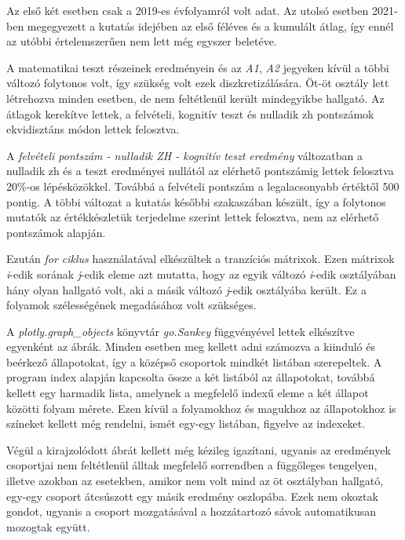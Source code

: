 \documentclass[12pt]{article}
\begin{document}
Az első két esetben csak a 2019-es évfolyamról volt adat. Az utolsó esetben 2021-ben megegyezett a kutatás idejében az első féléves és a kumulált átlag, így ennél az utóbbi értelemszerűen nem lett még egyszer beletéve.

A matematikai teszt részeinek eredményein és az \textit{A1}, \textit{A2} jegyeken kívül a többi változó folytonos volt, így szükség volt ezek diszkretizálására. Öt-öt osztály lett létrehozva minden esetben, de nem feltétlenül került mindegyikbe hallgató. Az átlagok kerekítve lettek, a felvételi, kognitív teszt és nulladik zh pontszámok ekvidisztáns módon lettek felosztva.

A \textit{felvételi pontszám - nulladik ZH - kognitív teszt eredmény} változatban a nulladik zh és a teszt eredményei nullától az elérhető pontszámig lettek felosztva 20\%-os lépésközökkel. Továbbá a felvételi pontszám a legalacsonyabb értéktől 500 pontig. A többi változat a kutatás későbbi szakaszában készült, így a folytonos mutatók az értékkészletük terjedelme szerint lettek felosztva, nem az elérhető pontszámok alapján.

Ezután \textit{for ciklus} használatával elkészültek a tranzíciós mátrixok. Ezen mátrixok \textit{i}-edik sorának \textit{j}-edik eleme azt mutatta, hogy az egyik változó \textit{i}-edik osztályában hány olyan hallgató volt, aki a másik változó \textit{j}-edik osztályába került. Ez a folyamok szélességének megadásához volt szükséges.

A \textit{plotly.graph\_objects} könyvtár \textit{go.Sankey} függvényével lettek elkészítve egyenként az ábrák. Minden esetben meg kellett adni számozva a kiinduló és beérkező állapotokat, így a középső csoportok mindkét listában szerepeltek. A program index alapján kapcsolta össze a két listából az állapotokat, továbbá kellett egy harmadik lista, amelynek a megfelelő indexű eleme a két állapot közötti folyam mérete. Ezen kívül a folyamokhoz és magukhoz az állapotokhoz is színeket kellett még rendelni, ismét egy-egy listában, figyelve az indexeket. 

Végül a kirajzolódott ábrát kellett még kézileg igazítani, ugyanis az eredmények csoportjai nem feltétlenül álltak megfelelő sorrendben a függőleges tengelyen, illetve azokban az esetekben, amikor nem volt mind az öt osztályban hallgató, egy-egy csoport átcsúszott egy másik eredmény oszlopába. Ezek nem okoztak gondot, ugyanis a csoport mozgatásával a hozzátartozó sávok automatikusan mozogtak együtt.
\end{document}
